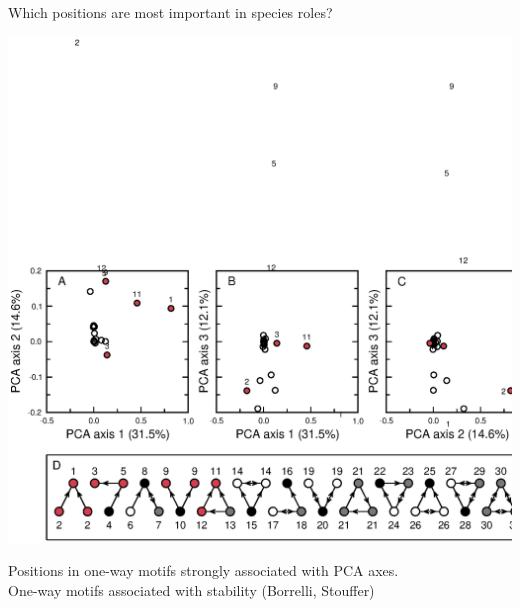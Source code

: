 \documentclass{beamer}
\begin{document}




  \begin{frame}{Which positions are most important in species roles?}
    \begin{centering}
      \includegraphics[width=\textwidth]{../manuscript/figures/roles/roleplot_talk_allred.eps}
    \end{centering}

    Positions in one-way motifs strongly associated with PCA axes.\\
    {\color{white} One-way motifs associated with stability (Borrelli, Stouffer)}
    \end{frame}
\end{document}
